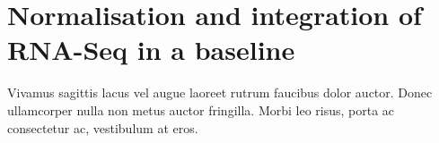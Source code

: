 \chapter{Normalisation and integration of RNA-Seq in a baseline}
\label{sec:baseline}

Vivamus sagittis lacus vel augue laoreet rutrum faucibus dolor auctor. Donec ullamcorper nulla non metus auctor fringilla. Morbi leo risus, porta ac consectetur ac, vestibulum at eros.


